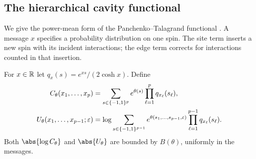 \subsection{The hierarchical cavity functional}

We give the power-mean form of the Panchenko--Talagrand functional
\cite[Section~5]{PT04}. A message $x$ specifies a probability distribution
on one spin. The site term inserts a new spin with its incident
interactions; the edge term corrects for interactions counted in that
insertion.

For $x\in\mathbb R$ let $q_x(s)=e^{xs}/(2\cosh x)$. Define
\begin{align}
 C_\theta(x_1,\ldots,x_p)
 &=\sum_{s\in\{-1,1\}^p}e^{\theta(s)}\prod_{\ell=1}^p q_{x_\ell}(s_\ell),
 \label{model:edge}\\
 U_\theta(x_1,\ldots,x_{p-1};\varepsilon)
 &=\log\sum_{s\in\{-1,1\}^{p-1}}
 e^{\theta(s_1,\ldots,s_{p-1},\varepsilon)}
 \prod_{\ell=1}^{p-1}q_{x_\ell}(s_\ell).
 \label{model:site-message}
\end{align}
Both $\abs{\log C_\theta}$ and $\abs{U_\theta}$ are bounded by $B(\theta)$,
uniformly in the messages.

